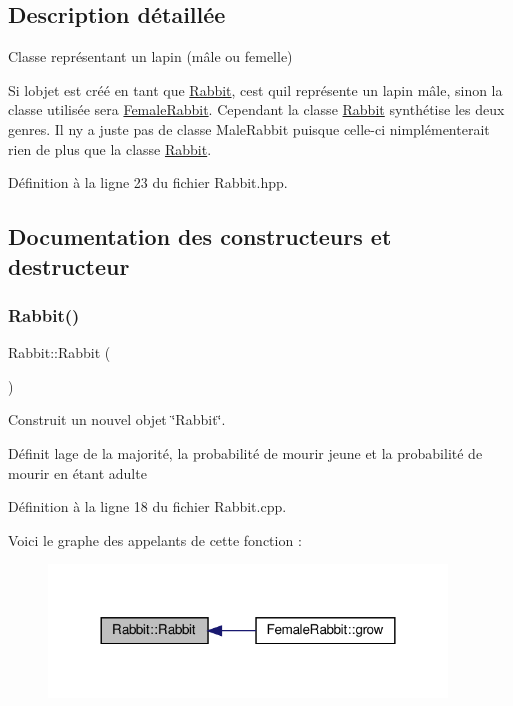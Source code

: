 \subsection{Description détaillée}
Classe représentant un lapin (mâle ou femelle) 

Si l\textquotesingle{}objet est créé en tant que \hyperlink{classRabbit}{Rabbit}, c\textquotesingle{}est qu\textquotesingle{}il représente un lapin mâle, sinon la classe utilisée sera \hyperlink{classFemaleRabbit}{Female\+Rabbit}. Cependant la classe \hyperlink{classRabbit}{Rabbit} synthétise les deux genres. Il n\textquotesingle{}y a juste pas de classe Male\+Rabbit puisque celle-\/ci n\textquotesingle{}implémenterait rien de plus que la classe \hyperlink{classRabbit}{Rabbit}. 

Définition à la ligne 23 du fichier Rabbit.\+hpp.



\subsection{Documentation des constructeurs et destructeur}
\mbox{\label{classRabbit_ae2093988d2ba8f561213a9767e8a31dd}} 
\subsubsection{\texorpdfstring{Rabbit()}{Rabbit()}}
{\footnotesize\ttfamily Rabbit\+::\+Rabbit (\begin{DoxyParamCaption}{ }\end{DoxyParamCaption})}



Construit un nouvel objet \char`\"{}\+Rabbit\char`\"{}. 

Définit l\textquotesingle{}age de la majorité, la probabilité de mourir jeune et la probabilité de mourir en étant adulte 

Définition à la ligne 18 du fichier Rabbit.\+cpp.

Voici le graphe des appelants de cette fonction \+:
\nopagebreak
\begin{figure}[H]
\begin{center}
\leavevmode
\includegraphics[width=300pt]{classRabbit_ae2093988d2ba8f561213a9767e8a31dd_icgraph}
\end{center}
\end{figure}
\mbox{\label{classRabbit_ac57586ffc31fffa6392638afbbd32774}} 
